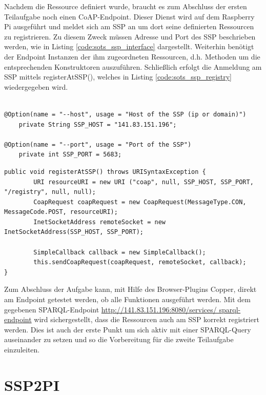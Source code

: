 Nachdem die Ressource definiert wurde, braucht es zum Abschluss der ersten Teilaufgabe noch einen CoAP-Endpoint. Dieser Dienst wird auf dem Raspberry Pi ausgeführt und meldet sich am SSP an um dort seine definierten Ressourcen zu registrieren. Zu diesem Zweck müssen Adresse und Port des SSP beschrieben werden, wie in Listing \ref{code:sots_ssp_interface} dargestellt. Weiterhin benötigt der Endpoint Instanzen der ihm zugeordneten Ressourcen, d.h. Methoden um die entsprechenden Konstruktoren auszuführen. Schließlich erfolgt die Anmeldung am SSP mittels {registerAtSSP()}, welches in Listing \ref{code:sots_ssp_registry} wiedergegeben wird.


\begin{lstlisting}[float=htb,caption={Definition der SSP Schnittstelle},label=code:sots_ssp_interface]

@Option(name = "--host", usage = "Host of the SSP (ip or domain)")
	private String SSP_HOST = "141.83.151.196";

@Option(name = "--port", usage = "Port of the SSP")
	private int SSP_PORT = 5683;

\end{lstlisting}




\begin{lstlisting}[float=htb,caption={Registrierung am SSP},label=code:sots_ssp_registry]
public void registerAtSSP() throws URISyntaxException {
        URI resourceURI = new URI ("coap", null, SSP_HOST, SSP_PORT, "/registry", null, null);
        CoapRequest coapRequest = new CoapRequest(MessageType.CON, MessageCode.POST, resourceURI);
        InetSocketAddress remoteSocket = new InetSocketAddress(SSP_HOST, SSP_PORT);

        SimpleCallback callback = new SimpleCallback();
        this.sendCoapRequest(coapRequest, remoteSocket, callback);
}
\end{lstlisting}

Zum Abschluss der Aufgabe kann, mit Hilfe des Browser-Plugins Copper, direkt am Endpoint getestet werden, ob alle Funktionen ausgeführt werden. Mit dem gegebenen SPARQL-Endpoint \url{http://141.83.151.196:8080/services/ sparql-endpoint} wird sichergestellt, dass die Ressourcen auch am SSP korrekt registriert werden. Dies ist auch der erste Punkt um sich aktiv mit einer SPARQL-Query auseinander zu setzen und so die Vorbereitung für die zweite Teilaufgabe einzuleiten.

\section{SSP2PI}
\label{sec:ssp2pi}

